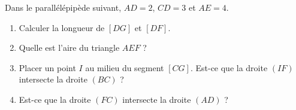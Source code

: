 
\begin{exercice}\label{exosmath-0648}

    Dans le parallélépipède suivant, \( AD=2\), \( CD=3\) et \( AE=4\).
\begin{center}
   
\end{center}

\begin{enumerate}
    \item
        Calculer la longueur de \(  [DG]\) et \( [DF]\).
    \item
        Quelle est l'aire du triangle \( AEF\) ?
    \item
        Placer un point \( I\) au milieu du segment \( [CG]\). Est-ce que la droite \( (IF)\) intersecte la droite \( (BC)\) ?
    \item
        Est-ce que la droite \( (FC)\) intersecte la droite \( (AD)\) ?
\end{enumerate}

\end{exercice}
